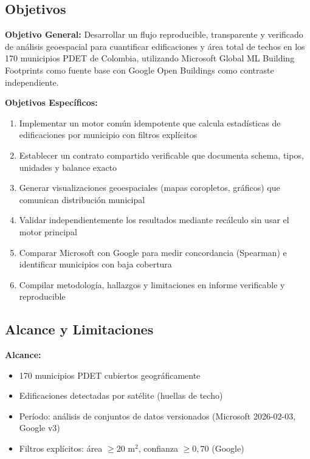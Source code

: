 \documentclass[11pt, a4paper]{article}
\begin{document}
\subsection{Objetivos}

\textbf{Objetivo General:} Desarrollar un flujo reproducible, transparente y verificado de análisis geoespacial para cuantificar edificaciones y área total de techos en los 170 municipios PDET de Colombia, utilizando Microsoft Global ML Building Footprints como fuente base con Google Open Buildings como contraste independiente.

\textbf{Objetivos Específicos:}
\begin{enumerate}
    \item Implementar un motor común idempotente que calcula estadísticas de edificaciones por municipio con filtros explícitos
    \item Establecer un contrato compartido verificable que documenta schema, tipos, unidades y balance exacto
    \item Generar visualizaciones geoespaciales (mapas coropletos, gráficos) que comunican distribución municipal
    \item Validar independientemente los resultados mediante recálculo sin usar el motor principal
    \item Comparar Microsoft con Google para medir concordancia (Spearman) e identificar municipios con baja cobertura
    \item Compilar metodología, hallazgos y limitaciones en informe verificable y reproducible
\end{enumerate}

\subsection{Alcance y Limitaciones}

\textbf{Alcance:}
\begin{itemize}
    \item 170 municipios PDET cubiertos geográficamente
    \item Edificaciones detectadas por satélite (huellas de techo)
    \item Período: análisis de conjuntos de datos versionados (Microsoft 2026-02-03, Google v3)
    \item Filtros explícitos: área $\geq 20$ m$^2$, confianza $\geq 0,70$ (Google)
\end{itemize}
\end{document}
